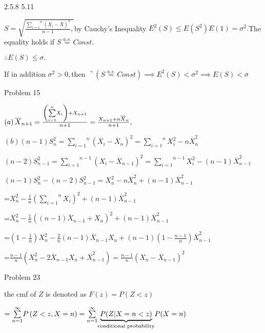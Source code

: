 \documentclass{article}
\begin{document}
2.5.8 5.11

\bigskip $S=\sqrt{\frac{\overset{n}{\underset{i=1}{\sum }}\left( X_{i}-%
\overline{X}\right) ^{2}}{n-1},}$by Cauchy's Inequality $E^{2}\left(
S\right) \leq E\left( S^{2}\right) E\left( 1\right) =\sigma ^{2}.$The
equality holds if $S\overset{a.s.}{=}Const.$

$\therefore E\left( S\right) \leq \sigma .$

If in addition $\sigma ^{2}>0,$then $\urcorner \left( S\overset{a.s.}{=}%
Const\right) \implies E^{2}\left( S\right) <\sigma ^{2}\implies E\left(
S\right) <\sigma $

Problem 15 

$\left( a\right) \overline{X}_{n+1}=\frac{\left( \overset{n}{\underset{i=1}{%
\sum }}X_{i}\right) +X_{n+1}}{n+1}=\frac{X_{n+1}+n\overline{X}_{n}}{n+1},$

$\left( b\right) \left( n-1\right) S_{n}^{2}=\overset{n}{\underset{i=1}{\sum 
}}\left( X_{i}-\overline{X}_{n}\right) ^{2}=\overset{n}{\underset{i=1}{\sum }%
}X_{i}^{2}-n\overline{X}_{n}^{2}$

$\left( n-2\right) S_{n-1}^{2}=\overset{n-1}{\underset{i=1}{\sum }}\left(
X_{i}-\overline{X}_{n-1}\right) ^{2}=\overset{n-1}{\underset{i=1}{\sum }}%
X_{i}^{2}-\left( n-1\right) \overline{X}_{n-1}^{2}$

$\left( n-1\right) S_{n}^{2}-\left( n-2\right) S_{n-1}^{2}=X_{n}^{2}-n%
\overline{X}_{n}^{2}+\left( n-1\right) \overline{X}_{n-1}^{2}$

=$X_{n}^{2}-\frac{1}{n}\left( \overset{n}{\underset{i=1}{\sum }}X_{i}\right)
^{2}+\left( n-1\right) \overline{X}_{n-1}^{2}$

=$X_{n}^{2}-\frac{1}{n}\left( \left( n-1\right) \overline{X}%
_{n-1}+X_{n}\right) ^{2}+\left( n-1\right) \overline{X}_{n-1}^{2}$

=$\left( 1-\frac{1}{n}\right) X_{n}^{2}-\frac{2}{n}\left( n-1\right) 
\overline{X}_{n-1}X_{n}+\left( n-1\right) \left( 1-\frac{n-1}{n}\right) 
\overline{X}_{n-1}^{2}$

=$\frac{n-1}{n}\left( X_{n}^{2}-2\overline{X}_{n-1}X_{n}+\overline{X}%
_{n-1}^{2}\right) =\frac{n-1}{n}\left( X_{n}-\overline{X}_{n-1}\right) ^{2}$

\bigskip Problem 23 

\bigskip the cmf of $Z$ is denoted as $F\left( z\right) =P\left( Z<z\right) $

$=\overset{\infty }{\underset{n=1}{\sum }}P\left( Z<z,X=n\right) =\overset{%
\infty }{\underset{n=1}{\sum }}\underset{\text{conditional probability}}{%
\underbrace{P(Z|X=n<z)}}P(X=n)$
\end{document}
